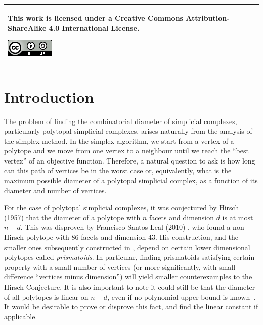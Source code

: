 \documentclass[12pt,a4paper]{article}
\theoremstyle{plain}
\theoremstyle{definition}
\begin{document}
~\\
\vfill
\begin{tabular}{|p{}|}
\hline
\vspace{0.08cm}
This work is licensed under a Creative Commons Attribution-ShareAlike 4.0 International License.
\begin{center}
\includegraphics[scale=1]{img/ccbysa.png}
\end{center}\\
\hline
\end{tabular}

\newpage

\tableofcontents
\clearpage
\vspace*{\fill}
\clearpage
\setcounter{page}{1}

\section{Introduction}
The problem of finding the combinatorial diameter of simplicial complexes, particularly polytopal simplicial complexes, arises naturally from the analysis of the simplex method. In the simplex algorithm, we start from a vertex of a polytope and we move from one vertex to a neighbour until we reach the ``best vertex'' of an objective function. Therefore, a natural question to ask is how long can this path of vertices be in the worst case or, equivalently, what is the maximum possible diameter of a polytopal simplicial complex, as a function of its diameter and number of vertices.

For the case of polytopal simplicial complexes, it was conjectured by Hirsch (1957) that the diameter of a polytope with $n$ facets and dimension $d$ is at most $n-d$. This was disproven by Francisco Santos Leal (2010) \cite{counterexample}, who found a non-Hirsch polytope with $86$ facets and dimension $43$. His construction, and the smaller ones subsequently constructed in \cite{improvement}, depend on certain lower dimensional polytopes called \emph{prismatoids}. In particular, finding prismatoids satisfying certain property with a small number of vertices (or more significantly, with small difference ``vertices minus dimension'') will yield smaller counterexamples to the Hirsch Conjecture. It is also important to note it could still be that the diameter of all polytopes is linear on $n-d$, even if no polynomial upper bound is known~\cite{Kalai:polymath3}. It would be desirable to prove or disprove this fact, and find the linear constant if applicable. 
\end{document}
